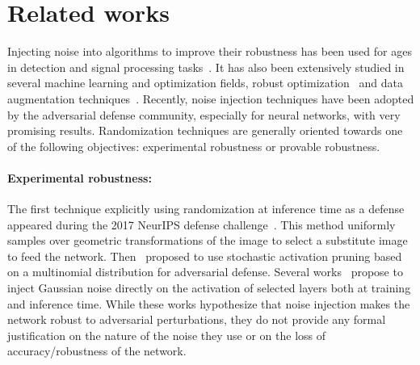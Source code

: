 \section{Related works}
\label{section:ap3-relatedwork}

Injecting noise into algorithms to improve their robustness has been used for ages in detection and signal processing tasks~\cite{zozor1999stochastic,chapeau2004noise,mitaim1998adaptive}.
It has also been extensively studied in several machine learning and optimization fields, \eg robust optimization~\cite{ben2009robust} and data augmentation techniques~\cite{perez2017effectiveness}.
Recently, noise injection techniques have been adopted by the adversarial defense community, especially for neural networks, with very promising results.
Randomization techniques are generally oriented towards one of the following objectives: experimental robustness or provable robustness.

\paragraph{Experimental robustness:}
The first technique explicitly using randomization at inference time as a defense appeared during the 2017 NeurIPS defense challenge~\cite{xie2017mitigating}.
This method uniformly samples over geometric transformations of the image to select a substitute image to feed the network.
Then~\citet{dhillon2018stochastic} proposed to use stochastic activation pruning based on a multinomial distribution for adversarial defense.
Several works~\cite{xuanqing2018towards,rakin2018parametric} propose to inject Gaussian noise directly on the activation of selected layers both at training and inference time.
While these works hypothesize that noise injection makes the network robust to adversarial perturbations, they do not provide any formal justification on the nature of the noise they use or on the loss of accuracy/robustness of the  network.

